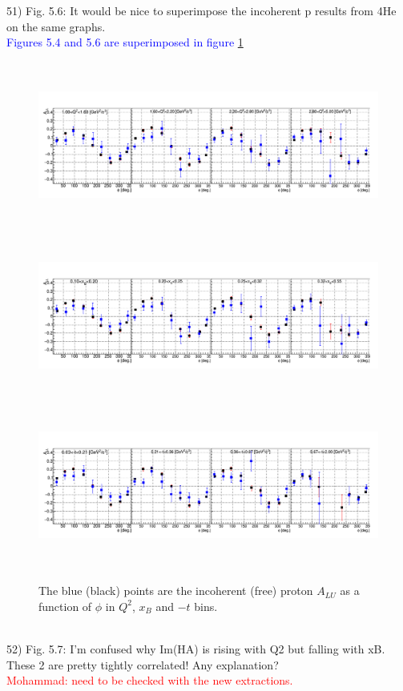 51) Fig. 5.6: It would be nice to superimpose the incoherent p results from 4He 
on the same graphs.\\
\textcolor{blue}{ Figures 5.4 and 5.6 are superimposed in figure
\ref{fig:incoh_free_ALU}}
\begin{figure}[tbp]

   \includegraphics[height=5.5cm]{fig/Q2_dep.png}
   \includegraphics[height=5.5cm]{fig/xB_dep.png}
   \includegraphics[height=5.5cm]{fig/t_dep.png}
   \caption{The blue (black) points are the incoherent (free) proton $A_{LU}$ 
   as a function of $\phi$ in $Q^{2}$, $x_{B}$ and $-t$ bins.}
   \label{fig:incoh_free_ALU}
\end{figure}
\\

52) Fig. 5.7: I'm confused why Im(HA) is rising with Q2 but falling with xB.  
These 2 are pretty tightly correlated! Any explanation?\\
\textcolor{red}{Mohammad: need to be checked with the new extractions.} \\

